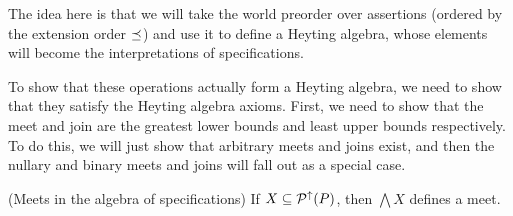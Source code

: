 The idea here is that we will take the world preorder over assertions
(ordered by the extension order $\preceq$) and use it to define a
Heyting algebra, whose elements will become the interpretations of
specifications.

To show that these operations actually form a Heyting algebra, we need
to show that they satisfy the Heyting algebra axioms. First, we need
to show that the meet and join are the greatest lower bounds and least
upper bounds respectively. To do this, we will just show that arbitrary
meets and joins exist, and then the nullary and binary meets and joins
will fall out as a special case.

\begin{lemma}{(Meets in the algebra of specifications)}
If $X \subseteq \mathcal{P}^{\uparrow}({P})$, then $\bigwedge X$ defines a meet. 
\end{lemma}

